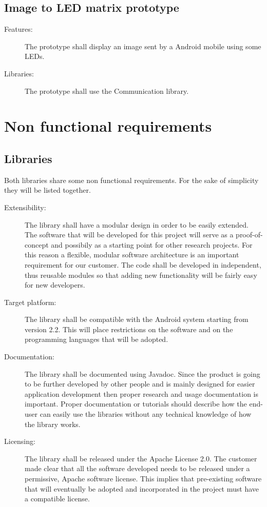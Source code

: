 	\subsection{Image to LED matrix prototype}
	\begin{description}
		\item[Features:] The prototype shall display an image sent by a Android
		mobile using some LEDs.
		\item[Libraries:] The prototype shall use the Communication library.
		\item[]
	\end{description}

\newpage

\section{Non functional requirements}

\subsection{Libraries}

Both libraries share some non functional requirements.
For the sake of simplicity they will be listed together.

\begin{description}
	\item[Extensibility:] The library shall have a modular design
	in order to be easily extended. The software that will be developed for
	this project will serve as a proof-of-concept and possibily as a starting point
	for other research projects. For this reason a flexible, modular software
	architecture is an important requirement for our customer. The code shall be
	developed in independent, thus reusable modules so that adding new functionality
	will be fairly easy for new developers.
	\item[Target platform:] The library shall be compatible with the Android
	system starting from version 2.2. This will place restrictions on the software
	and on the programming languages that will be adopted.
	\item[Documentation:] The library shall be documented using Javadoc.
	Since the product is going to be further developed by other people and is
	mainly designed for easier application development then proper research and usage
	documentation is important. Proper documentation or tutorials should describe how
	the end-user can easily use the libraries without any technical knowledge of how
	the library works.
	\item[Licensing:] The library shall be released under the Apache License 2.0.
	The customer made clear that all the software developed needs to be released
	under a permissive, Apache software license. This implies that pre-existing
	software that will eventually be adopted and incorporated in the project must
	have a compatible license.
\end{description}


